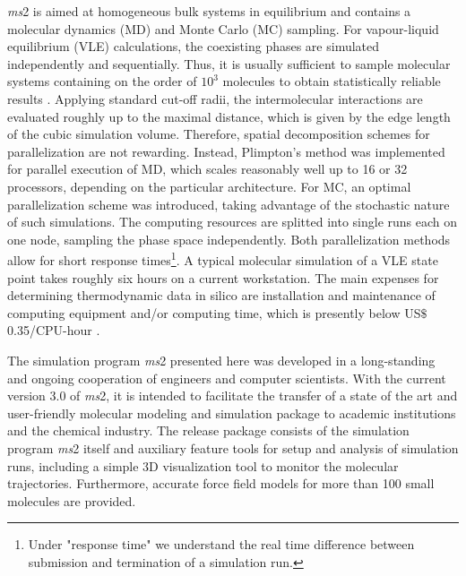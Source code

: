 \textit{ms}2 is aimed at homogeneous bulk systems in equilibrium and contains a molecular dynamics (MD) and Monte Carlo (MC) sampling. For vapour-liquid equilibrium (VLE) calculations, the coexisting phases are simulated independently and sequentially. Thus, it is usually sufficient to sample molecular systems containing on the order of $10^{3}$  molecules to obtain statistically reliable results \parencite{lyubartsev}. Applying standard cut-off radii, the intermolecular interactions are evaluated roughly up to the maximal distance, which is given by the edge length of the cubic simulation volume. Therefore, spatial decomposition schemes for parallelization are not rewarding. Instead, Plimpton's method \parencite{plimpton} was implemented for parallel execution of MD, which scales reasonably well up to 16 or 32 processors, depending on the particular architecture. For MC, an optimal parallelization scheme was introduced, taking advantage of the stochastic nature of such simulations. The computing resources are splitted into single runs each on one node, sampling the phase space independently. Both parallelization methods allow for short response times\footnote{Under "response time" we understand the real time difference between submission and termination of a simulation run.}. A typical molecular simulation of a VLE state point takes roughly six hours on a current workstation. The main expenses for determining thermodynamic data in silico are installation and maintenance of computing equipment and/or computing time, which is presently below US$\$$ 0.35/CPU-hour \parencite{economist}.

The simulation program \textit{ms}2 presented here was developed in a long-standing and ongoing cooperation of engineers and computer scientists. With the current version 3.0 of \textit{ms}2, it is intended to facilitate the transfer of a state of the art and user-friendly molecular modeling and simulation package to academic institutions and the chemical industry. The release package consists of the simulation program \textit{ms}2 itself and auxiliary feature tools for setup and analysis of simulation runs, including a simple 3D visualization tool to monitor the molecular trajectories. Furthermore, accurate force field models for more than 100 small molecules are provided.







